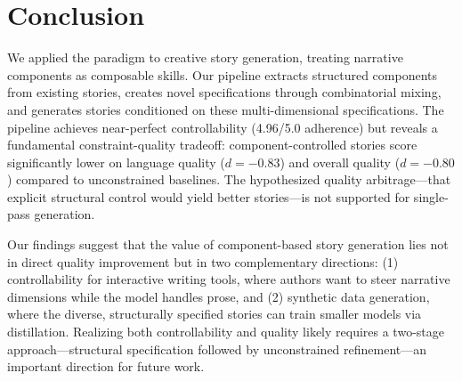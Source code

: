 \section{Conclusion}
\label{sec:conclusion}

We applied the \skillmix paradigm to creative story generation, treating narrative components as composable skills.
Our \methodname pipeline extracts structured components from existing stories, creates novel specifications through combinatorial mixing, and generates stories conditioned on these multi-dimensional specifications.
The pipeline achieves near-perfect controllability (4.96/5.0 adherence) but reveals a fundamental constraint-quality tradeoff: component-controlled stories score significantly lower on language quality ($d{=}{-}0.83$) and overall quality ($d{=}{-}0.80$) compared to unconstrained baselines.
The hypothesized quality arbitrage---that explicit structural control would yield better stories---is not supported for single-pass generation.

Our findings suggest that the value of component-based story generation lies not in direct quality improvement but in two complementary directions: (1) controllability for interactive writing tools, where authors want to steer narrative dimensions while the model handles prose, and (2) synthetic data generation, where the diverse, structurally specified stories can train smaller models via distillation.
Realizing both controllability and quality likely requires a two-stage approach---structural specification followed by unconstrained refinement---an important direction for future work.
